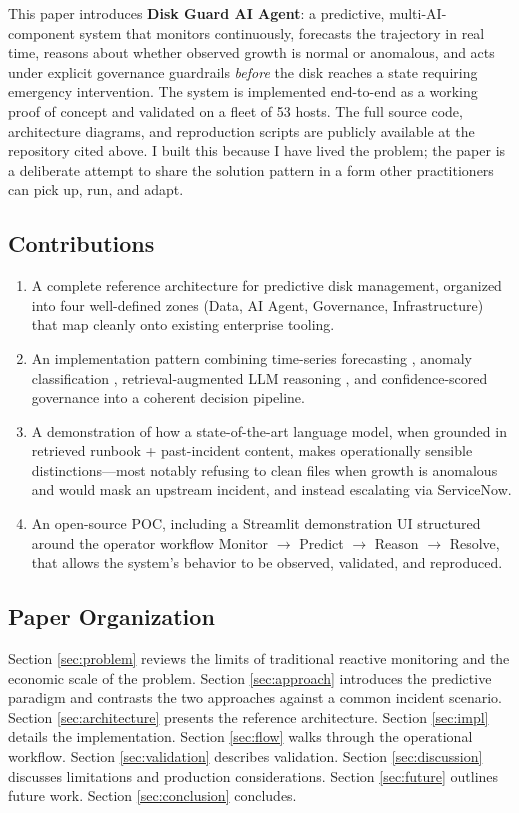 \documentclass[conference]{IEEEtran}
\begin{document}
This paper introduces \textbf{Disk Guard AI Agent}: a predictive,
multi-AI-component system that monitors continuously, forecasts the
trajectory in real time, reasons about whether observed growth is
normal or anomalous, and acts under explicit governance guardrails
\emph{before} the disk reaches a state requiring emergency
intervention. The system is implemented end-to-end as a working
proof of concept and validated on a fleet of 53 hosts. The full
source code, architecture diagrams, and reproduction scripts are
publicly available at the repository cited above. I built this
because I have lived the problem; the paper is a deliberate attempt
to share the solution pattern in a form other practitioners can pick
up, run, and adapt.

\subsection{Contributions}
\begin{enumerate}
\item A complete reference architecture for predictive disk
management, organized into four well-defined zones (Data, AI Agent,
Governance, Infrastructure) that map cleanly onto existing enterprise
tooling.
\item An implementation pattern combining time-series forecasting
\cite{taylor2018forecasting}, anomaly classification
\cite{chen2016xgboost}, retrieval-augmented LLM reasoning
\cite{lewis2020rag}, and confidence-scored governance into a coherent
decision pipeline.
\item A demonstration of how a state-of-the-art language model, when
grounded in retrieved runbook + past-incident content, makes
operationally sensible distinctions---most notably refusing to clean
files when growth is anomalous and would mask an upstream incident,
and instead escalating via ServiceNow.
\item An open-source POC, including a Streamlit demonstration UI
structured around the operator workflow Monitor $\rightarrow$
Predict $\rightarrow$ Reason $\rightarrow$ Resolve, that allows the
system's behavior to be observed, validated, and reproduced.
\end{enumerate}

\subsection{Paper Organization}
Section \ref{sec:problem} reviews the limits of traditional reactive
monitoring and the economic scale of the problem. Section
\ref{sec:approach} introduces the predictive paradigm and contrasts
the two approaches against a common incident scenario. Section
\ref{sec:architecture} presents the reference architecture. Section
\ref{sec:impl} details the implementation. Section \ref{sec:flow}
walks through the operational workflow. Section \ref{sec:validation}
describes validation. Section \ref{sec:discussion} discusses
limitations and production considerations. Section \ref{sec:future}
outlines future work. Section \ref{sec:conclusion} concludes.
\end{document}

